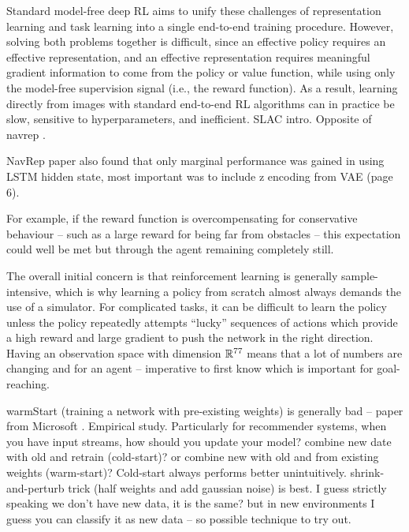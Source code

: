Standard model-free deep RL aims to unify these challenges of representation learning and task learning into a single end-to-end training procedure. However, solving both problems together is difficult, since an effective policy requires an effective representation, and an effective representation requires meaningful gradient information to come from the policy or value function, while using only the model-free supervision signal (i.e., the reward function). As a result, learning directly from images with standard end-to-end RL algorithms can in practice be slow, sensitive to hyperparameters, and inefficient. SLAC \cite{stochastic_latent_actor_critic} intro. Opposite of navrep \cite{NavRep_unsupervised}.

NavRep paper also found that only marginal performance was gained in using LSTM hidden state, most important was to include z encoding from VAE (page 6).

For example, if the reward function is overcompensating for conservative behaviour -- such as a large reward for being far from obstacles -- this expectation could well be met but through the agent remaining completely still.
 
The overall initial concern is that reinforcement learning is generally sample-intensive, which is why learning a policy from scratch almost always demands the use of a simulator. For complicated tasks, it can be difficult to learn the policy unless the policy repeatedly attempts ``lucky'' sequences of actions which provide a high reward and large gradient to push the network in the right direction. Having an observation space with dimension $\mathbb{R}^{77}$ means that a lot of numbers are changing and for an agent -- imperative to first know which is important for goal-reaching.
 
warmStart (training a network with pre-existing weights) is generally bad -- paper from Microsoft \cite{warmStart}. Empirical study. Particularly for recommender systems, when you have input streams, how should you update your model? combine new date with old and retrain (cold-start)? or combine new with old and from existing weights (warm-start)? Cold-start always performs better unintuitively. \cite{warmStart} shrink-and-perturb trick (half weights and add gaussian noise) is best. I guess strictly speaking we don't have new data, it is the same? but in new environments I guess you can classify it as new data -- so possible technique to try out.
 
